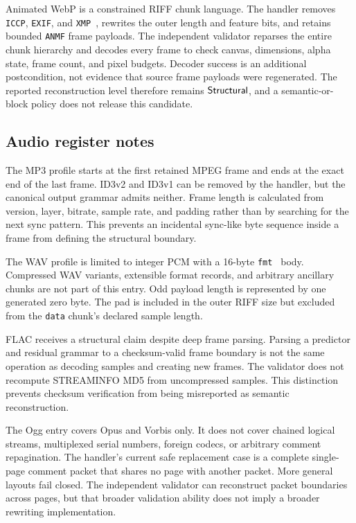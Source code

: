 Animated WebP is a constrained RIFF chunk language.  The handler removes
\texttt{ICCP}, \texttt{EXIF}, and \texttt{XMP }, rewrites the outer length and
feature bits, and retains bounded \texttt{ANMF} frame payloads.  The independent
validator reparses the entire chunk hierarchy and decodes every frame to check
canvas, dimensions, alpha state, frame count, and pixel budgets.  Decoder
success is an additional postcondition, not evidence that source frame payloads
were regenerated.  The reported reconstruction level therefore remains
$\mathsf{Structural}$, and a semantic-or-block policy does not release this candidate.

\subsection{Audio register notes}

The MP3 profile starts at the first retained MPEG frame and ends at the exact
end of the last frame.  ID3v2 and ID3v1 can be removed by the handler, but the
canonical output grammar admits neither.  Frame length is calculated from
version, layer, bitrate, sample rate, and padding rather than by searching for
the next sync pattern.  This prevents an incidental sync-like byte sequence
inside a frame from defining the structural boundary.

The WAV profile is limited to integer PCM with a 16-byte \texttt{fmt } body.
Compressed WAV variants, extensible format records, and arbitrary ancillary
chunks are not part of this entry.  Odd payload length is represented by one
generated zero byte.  The pad is included in the outer RIFF size but excluded
from the \texttt{data} chunk's declared sample length.

FLAC receives a structural claim despite deep frame parsing.  Parsing a
predictor and residual grammar to a checksum-valid frame boundary is not the
same operation as decoding samples and creating new frames.  The validator
does not recompute STREAMINFO MD5 from uncompressed samples.  This distinction
prevents checksum verification from being misreported as semantic
reconstruction.

The Ogg entry covers Opus and Vorbis only.  It does not cover chained logical
streams, multiplexed serial numbers, foreign codecs, or arbitrary comment
repagination.  The handler's current safe replacement case is a complete
single-page comment packet that shares no page with another packet.  More
general layouts fail closed.  The independent validator can reconstruct packet
boundaries across pages, but that broader validation ability does not imply a
broader rewriting implementation.

